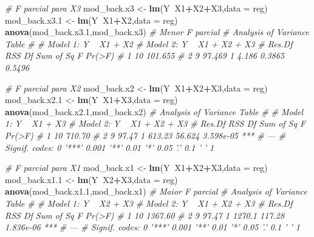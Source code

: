 \documentclass[
]{book}
\newenvironment{Shaded}{\begin{snugshade}}{\end{snugshade}}
\newcommand{\CommentTok}[1]{\textcolor[rgb]{0.56,0.35,0.01}{\textit{#1}}}
\newcommand{\DataTypeTok}[1]{\textcolor[rgb]{0.13,0.29,0.53}{#1}}
\newcommand{\FloatTok}[1]{\textcolor[rgb]{0.00,0.00,0.81}{#1}}
\newcommand{\KeywordTok}[1]{\textcolor[rgb]{0.13,0.29,0.53}{\textbf{#1}}}
\newcommand{\NormalTok}[1]{#1}
\newcommand{\OperatorTok}[1]{\textcolor[rgb]{0.81,0.36,0.00}{\textbf{#1}}}
\newcommand{\StringTok}[1]{\textcolor[rgb]{0.31,0.60,0.02}{#1}}
\begin{document}
\begin{Shaded}
\begin{Highlighting}[]
\CommentTok{# F parcial para X3}
\NormalTok{mod_back.x3 <-}\StringTok{ }\KeywordTok{lm}\NormalTok{(Y}\OperatorTok{~}\NormalTok{X1}\OperatorTok{+}\NormalTok{X2}\OperatorTok{+}\NormalTok{X3,}\DataTypeTok{data =}\NormalTok{ reg)}
\NormalTok{mod_back.x3}\FloatTok{.1}\NormalTok{ <-}\StringTok{ }\KeywordTok{lm}\NormalTok{(Y}\OperatorTok{~}\NormalTok{X1}\OperatorTok{+}\NormalTok{X2,}\DataTypeTok{data =}\NormalTok{ reg)}
\KeywordTok{anova}\NormalTok{(mod_back.x3}\FloatTok{.1}\NormalTok{,mod_back.x3) }\CommentTok{# Menor F parcial}
\CommentTok{# Analysis of Variance Table}
\CommentTok{# }
\CommentTok{# Model 1: Y ~ X1 + X2}
\CommentTok{# Model 2: Y ~ X1 + X2 + X3}
\CommentTok{#   Res.Df     RSS Df Sum of Sq      F Pr(>F)}
\CommentTok{# 1     10 101.655                           }
\CommentTok{# 2      9  97.469  1     4.186 0.3865 0.5496}

\CommentTok{# F parcial para X2}
\NormalTok{mod_back.x2 <-}\StringTok{ }\KeywordTok{lm}\NormalTok{(Y}\OperatorTok{~}\NormalTok{X1}\OperatorTok{+}\NormalTok{X2}\OperatorTok{+}\NormalTok{X3,}\DataTypeTok{data =}\NormalTok{ reg)}
\NormalTok{mod_back.x2}\FloatTok{.1}\NormalTok{ <-}\StringTok{ }\KeywordTok{lm}\NormalTok{(Y}\OperatorTok{~}\NormalTok{X1}\OperatorTok{+}\NormalTok{X3,}\DataTypeTok{data =}\NormalTok{ reg)}
\KeywordTok{anova}\NormalTok{(mod_back.x2}\FloatTok{.1}\NormalTok{,mod_back.x2)}
\CommentTok{# Analysis of Variance Table}
\CommentTok{# }
\CommentTok{# Model 1: Y ~ X1 + X3}
\CommentTok{# Model 2: Y ~ X1 + X2 + X3}
\CommentTok{#   Res.Df    RSS Df Sum of Sq      F    Pr(>F)    }
\CommentTok{# 1     10 710.70                                  }
\CommentTok{# 2      9  97.47  1    613.23 56.624 3.598e-05 ***}
\CommentTok{# ---}
\CommentTok{# Signif. codes:  0 '***' 0.001 '**' 0.01 '*' 0.05 '.' 0.1 ' ' 1}

\CommentTok{# F parcial para X1}
\NormalTok{mod_back.x1 <-}\StringTok{ }\KeywordTok{lm}\NormalTok{(Y}\OperatorTok{~}\NormalTok{X1}\OperatorTok{+}\NormalTok{X2}\OperatorTok{+}\NormalTok{X3,}\DataTypeTok{data =}\NormalTok{ reg)}
\NormalTok{mod_back.x1}\FloatTok{.1}\NormalTok{ <-}\StringTok{ }\KeywordTok{lm}\NormalTok{(Y}\OperatorTok{~}\NormalTok{X2}\OperatorTok{+}\NormalTok{X3,}\DataTypeTok{data =}\NormalTok{ reg)}
\KeywordTok{anova}\NormalTok{(mod_back.x1}\FloatTok{.1}\NormalTok{,mod_back.x1) }\CommentTok{# Maior F parcial }
\CommentTok{# Analysis of Variance Table}
\CommentTok{# }
\CommentTok{# Model 1: Y ~ X2 + X3}
\CommentTok{# Model 2: Y ~ X1 + X2 + X3}
\CommentTok{#   Res.Df     RSS Df Sum of Sq      F    Pr(>F)    }
\CommentTok{# 1     10 1367.60                                  }
\CommentTok{# 2      9   97.47  1    1270.1 117.28 1.836e-06 ***}
\CommentTok{# ---}
\CommentTok{# Signif. codes:  0 '***' 0.001 '**' 0.01 '*' 0.05 '.' 0.1 ' ' 1}


\end{Highlighting}
\end{Shaded}
\end{document}
